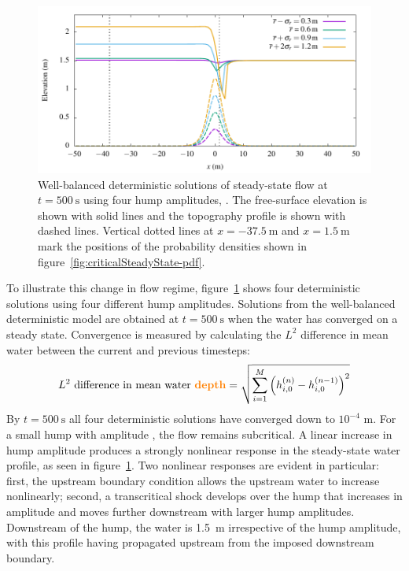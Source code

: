 \begin{figure}
    \centering
    \includegraphics{fig-criticalSteadyState-examples.pdf}
    \caption{Well-balanced deterministic solutions of steady-state flow at $t = \SI{500}{\second}$ using four hump amplitudes, .
    The free-surface elevation is shown with solid lines and the topography profile is shown with dashed lines.
    Vertical dotted lines at $x = \SI{-37.5}{\meter}$ and $x = \SI{1.5}{\meter}$ mark the positions of the probability densities shown in figure~\ref{fig:criticalSteadyState-pdf}.}
    \label{fig:criticalSteadyState-examples}
\end{figure}

To illustrate this change in flow regime, figure~\ref{fig:criticalSteadyState-examples} shows four deterministic solutions using four different hump amplitudes.
Solutions from the well-balanced deterministic model are obtained at $t = \SI{500}{\second}$ when the water has converged on a steady state.
Convergence is measured by calculating the $L^2$ difference in mean water  between the current and previous timesteps:
\begin{align}
    L^2 \text{ difference in mean water \textcolor{orange}{\textbf{depth}}} = \sqrt{\sum_{i=1}^M \left(h_{i,0}^{(n)} - h_{i,0}^{(n-1)}\right)^2} \label{eqn:convergence}
\end{align}
By $t = \SI{500}{\second}$ all four deterministic solutions have converged down to $10^{-4}$ \si{\meter}.
For a small hump with amplitude , the flow remains subcritical.
A linear increase in hump amplitude produces a strongly nonlinear response in the steady-state water profile, as seen in figure~\ref{fig:criticalSteadyState-examples}. 
Two nonlinear responses are evident in particular: first, the upstream boundary condition allows the upstream water  to increase nonlinearly; second, a transcritical shock develops over the hump that increases in amplitude and moves further downstream with larger hump amplitudes.
Downstream of the hump, the water  is \SI{1.5}{\meter} irrespective of the hump amplitude, with this profile having propagated upstream from the imposed downstream boundary.


